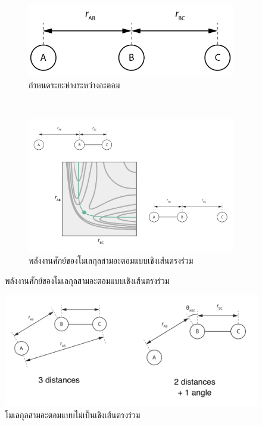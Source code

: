 \begin{figure}[htbp]
    \centering
    \begin{subfigure}{0.7\textwidth}
        \centering
        \includegraphics[width=0.9\linewidth]{fig/3-body_collinear.png}
        \caption{กำหนดระยะห่างระหว่างอะตอม}
        \label{fig:3_body_mol}
    \end{subfigure}%
    \\
    \begin{subfigure}{0.9\textwidth}
        \centering
        \includegraphics[width=0.9\linewidth]{fig/3-body_collinear_PES.png}
        \caption{พลังงานศักย์ของโมเลกุลสามอะตอมแบบเชิงเส้นตรงร่วม}
        \label{fig:PES_3_body_mol}
    \end{subfigure}
    \label{fig:3_body_mol_and_PES}
\end{figure}

\begin{figure}[htbp]
    \centering
    \includegraphics[width=0.9\linewidth]{fig/3-body_non-collinear.png}
    \caption{โมเลกุลสามอะตอมแบบไม่เป็นเชิงเส้นตรงร่วม}
    \label{fig:non_collinear}
\end{figure}

